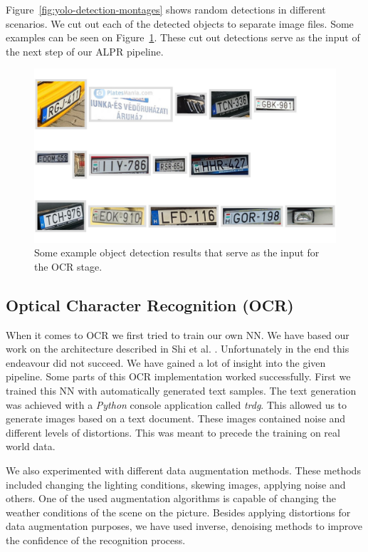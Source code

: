 Figure~\ref{fig:yolo-detection-montages}  shows random detections in different
scenarios. We cut out each of the detected objects to separate image files. Some
examples can be seen on Figure~\ref{fig:cutout-montage}.
These cut out detections serve as the input of the next step of our \ac{ALPR}
pipeline.
\begin{figure}
    \includegraphics[width=\textwidth]{figures/yolo/cutout_montage.jpg}
    \caption{Some example object detection results that serve as the
    input for the OCR stage.}
    \label{fig:cutout-montage}
\end{figure}

\subsection{Optical Character Recognition (OCR)}

When it comes to \ac{OCR} we first tried to train our own \ac{NN}.  We have
based our work on the architecture described in Shi et al. \cite{7801919}.
Unfortunately in the end this endeavour did not succeed.  We have gained a lot
of insight into the given pipeline.  Some parts of this \ac{OCR} implementation
worked successfully.  First we trained this \ac{NN} with automatically generated
text samples.  The text generation was achieved with a \emph{Python} console
application called \emph{trdg}.  This allowed us to generate images based on
a text document.  These images contained noise and different levels of
distortions.  This was meant to precede the training on real world data.

We also experimented with different data augmentation methods.  These methods
included changing the lighting conditions, skewing images, applying noise and
others.  One of the used augmentation algorithms is capable of changing the
weather conditions of the scene on the picture.  Besides applying distortions
for data augmentation purposes, we have used inverse, denoising methods to
improve the confidence of the recognition process.

